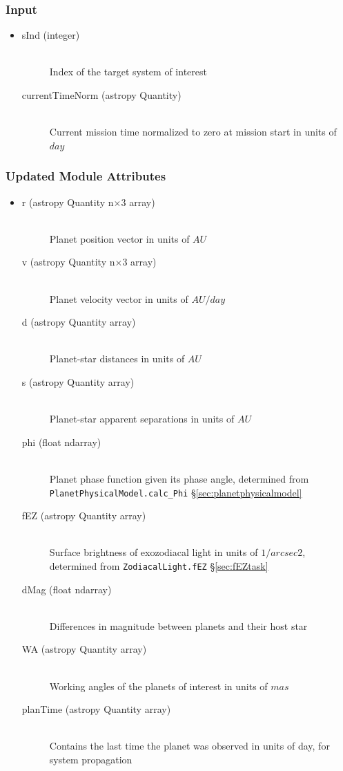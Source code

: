 \documentclass[cleanfoot]{asme2ej}
\begin{document}
\subsubsection*{Input}
\begin{itemize}
\item 
\begin{description}
    \item[sInd (integer)] \hfill \\ Index of the target system of interest
    \item[currentTimeNorm (astropy Quantity)] \hfill \\ Current mission time normalized to zero at mission start in units of $day$
\end{description}
\end{itemize}

\subsubsection*{Updated Module Attributes}
\begin{itemize}
\item 
\begin{description}
    \item[r (astropy Quantity n$\times$3 array)] \hfill \\ Planet position vector in units of $ AU $
    \item[v (astropy Quantity n$\times$3 array)] \hfill \\ Planet velocity vector in units of $ AU/day $
    \item[d (astropy Quantity array)] \hfill \\ Planet-star distances in units of $ AU $
    \item[s (astropy Quantity array)] \hfill \\ Planet-star apparent separations in units of $ AU $
    \item[phi (float ndarray)] \hfill \\ Planet phase function given its phase angle, determined from \verb+PlanetPhysicalModel.calc_Phi+ \S\ref{sec:planetphysicalmodel}
    \item[fEZ (astropy Quantity array)] \hfill \\ Surface brightness of exozodiacal light in units of $ 1/arcsec2 $, determined from \verb+ZodiacalLight.fEZ+ \S\ref{sec:fEZtask}
    \item[dMag (float ndarray)] \hfill \\ Differences in magnitude between planets and their host star
    \item[WA (astropy Quantity array)] \hfill \\ Working angles of the planets of interest in units of $ mas $ 
    \item[planTime (astropy Quantity array)] \hfill \\ Contains the last time the planet was observed in units of day, for system propagation
\end{description}
\end{itemize}
\end{document}
